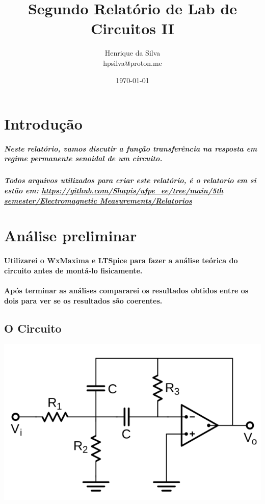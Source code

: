 \documentclass[12pt,twoside, a4paper, twocolumn]{article}
\title{Segundo Relatório de Lab de Circuitos II}
\author{Henrique da Silva \\ hpsilva@proton.me}
\date{\today}
\begin{document}
\maketitle
{}
\newpage
\tableofcontents
\newpage






\section{Introdução}




\subparagraph*{Neste relatório, vamos discutir a função transferência na resposta em regime permanente senoidal de um circuito.}


\subparagraph*{Todos arquivos utilizados para criar este relatório, é o relatorio em si estão em:  \url{https://github.com/Shapis/ufpe_ee/tree/main/5th semester/Electromagnetic Measurements/Relatorios}}








\section{Análise preliminar}


\paragraph*{Utilizarei o WxMaxima e LTSpice para fazer a análise teórica do circuito antes de montá-lo fisicamente.}


\paragraph*{Após terminar as análises compararei os resultados obtidos entre os dois para ver se os resultados são coerentes.}


\subsection{O Circuito}
\begin{adjustbox}{scale=0.30}
    \includegraphics{AnaliseNodal.png}
\end{adjustbox}
\newpage
\end{document}
